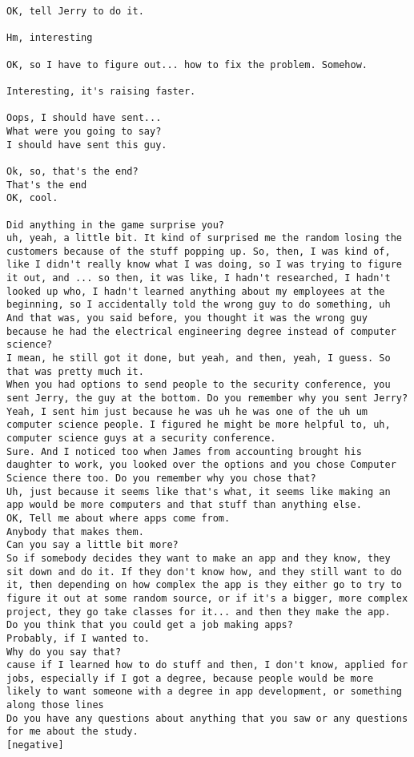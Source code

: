 \begin{lstlisting}
OK, tell Jerry to do it.

Hm, interesting

OK, so I have to figure out... how to fix the problem. Somehow.

Interesting, it's raising faster.

Oops, I should have sent...
What were you going to say?
I should have sent this guy.

Ok, so, that's the end?
That's the end
OK, cool.

Did anything in the game surprise you?
uh, yeah, a little bit. It kind of surprised me the random losing the customers because of the stuff popping up. So, then, I was kind of, like I didn't really know what I was doing, so I was trying to figure it out, and ... so then, it was like, I hadn't researched, I hadn't looked up who, I hadn't learned anything about my employees at the beginning, so I accidentally told the wrong guy to do something, uh
And that was, you said before, you thought it was the wrong guy because he had the electrical engineering degree instead of computer science?
I mean, he still got it done, but yeah, and then, yeah, I guess. So that was pretty much it.
When you had options to send people to the security conference, you sent Jerry, the guy at the bottom. Do you remember why you sent Jerry?
Yeah, I sent him just because he was uh he was one of the uh um computer science people. I figured he might be more helpful to, uh, computer science guys at a security conference.
Sure. And I noticed too when James from accounting brought his daughter to work, you looked over the options and you chose Computer Science there too. Do you remember why you chose that?
Uh, just because it seems like that's what, it seems like making an app would be more computers and that stuff than anything else.
OK, Tell me about where apps come from.
Anybody that makes them.
Can you say a little bit more?
So if somebody decides they want to make an app and they know, they sit down and do it. If they don't know how, and they still want to do it, then depending on how complex the app is they either go to try to figure it out at some random source, or if it's a bigger, more complex project, they go take classes for it... and then they make the app.
Do you think that you could get a job making apps?
Probably, if I wanted to.
Why do you say that?
cause if I learned how to do stuff and then, I don't know, applied for jobs, especially if I got a degree, because people would be more likely to want someone with a degree in app development, or something along those lines
Do you have any questions about anything that you saw or any questions for me about the study.
[negative]
\end{lstlisting}

